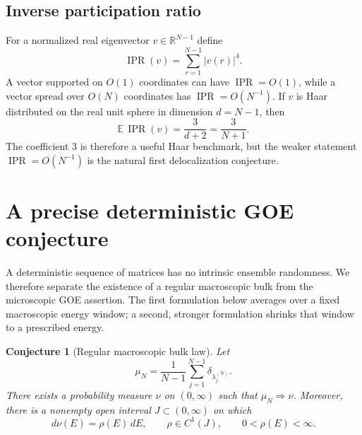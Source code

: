 \documentclass[11pt]{amsart}
\numberwithin{equation}{section}
\theoremstyle{plain}
\newtheorem{conjecture}[theorem]{Conjecture}
\theoremstyle{definition}
\theoremstyle{remark}
\newcommand{\IPR}{\operatorname{IPR}}
\begin{document}
\subsection{Inverse participation ratio}
\label{subsec:ipr}

For a normalized real eigenvector $v\in\mathbb R^{N-1}$ define
\begin{equation}
\IPR(v)=\sum_{r=1}^{N-1}|v(r)|^4.
\label{eq:ipr_definition}
\end{equation}
A vector supported on $O(1)$ coordinates can have $\IPR=O(1)$, while a vector spread over $O(N)$ coordinates has $\IPR=O(N^{-1})$.  If $v$ is Haar distributed on the real unit sphere in dimension $d=N-1$, then
\begin{equation}
\mathbb E\,\IPR(v)=\frac{3}{d+2}=\frac{3}{N+1}.
\label{eq:haar_ipr}
\end{equation}
The coefficient $3$ is therefore a useful Haar benchmark, but the weaker statement $\IPR=O(N^{-1})$ is the natural first delocalization conjecture.

\section{A precise deterministic GOE conjecture}
\label{sec:goe_conjecture}

A deterministic sequence of matrices has no intrinsic ensemble randomness.  We therefore separate the existence of a regular macroscopic bulk from the microscopic GOE assertion.  The first formulation below averages over a fixed macroscopic energy window; a second, stronger formulation shrinks that window to a prescribed energy.

\begin{conjecture}[Regular macroscopic bulk law]
\label{conj:bulk_density}
Let
\begin{equation}
\mu_N=\frac{1}{N-1}\sum_{j=1}^{N-1}\delta_{\lambda_j^{(N)}}.
\label{eq:empirical_spectral_measure}
\end{equation}
There exists a probability measure $\nu$ on $(0,\infty)$ such that $\mu_N\Rightarrow\nu$.  Moreover, there is a nonempty open interval $J\subset(0,\infty)$ on which
\begin{equation}
d\nu(E)=\rho(E)\,dE,
\qquad
\rho\in C^1(J),
\qquad
0<\rho(E)<\infty.
\label{eq:regular_bulk_density}
\end{equation}
\end{conjecture}
\end{document}
